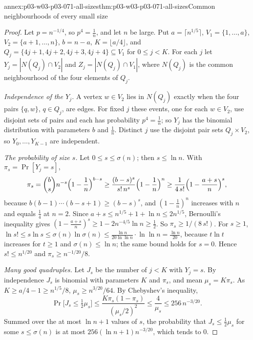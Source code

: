 \begin{annexitem}{annex:p03-w03-p03-071-all-sizes}{thm:p03-w03-p03-071-all-sizes}{Common neighbourhoods of every small size}
\begin{proof}
Let \(p=n^{-1/4}\), so \(p^4=\frac1n\), and let \(n\) be large.  Put
\(a=\lceil n^{1/5}\rceil\), \(V_1=\{1,\ldots,a\}\),
\(V_2=\{a+1,\ldots,n\}\), \(b=n-a\), \(K=\lfloor a/4\rfloor\), and
\(Q_j=\{4j+1,4j+2,4j+3,4j+4\}\subseteq V_1\) for \(0\leq j<K\).
For each \(j\) let \(Y_j=|N(Q_j)\cap V_2|\) and
\(Z_j=|N(Q_j)\cap V_1|\), where \(N(Q_j)\) is the common neighbourhood
of the four elements of \(Q_j\).

\emph{Independence of the \(Y_j\).}  A vertex \(w\in V_2\) lies in
\(N(Q_j)\) exactly when the four pairs \(\{q,w\}\), \(q\in Q_j\), are edges.
For fixed \(j\) these events, one for each \(w\in V_2\), use disjoint
sets of pairs and each has probability \(p^4=\frac1n\); so \(Y_j\) has the
binomial distribution with parameters \(b\) and \(\frac1n\).  Distinct
\(j\) use the disjoint pair sets \(Q_j\times V_2\), so
\(Y_0,\ldots,Y_{K-1}\) are independent.

\emph{The probability of size \(s\).}  Let \(0\leq s\leq\sigma(n)\); then
\(s\leq\ln n\).  With \(\pi_s=\Pr[Y_j=s]\),
\[
  \pi_s=\binom bs n^{-s}\Bigl(1-\frac1n\Bigr)^{b-s}
  \geq\frac{(b-s)^s}{s!\,n^s}\Bigl(1-\frac1n\Bigr)^{n}
  \geq\frac1{4\,s!}\Bigl(1-\frac{a+s}n\Bigr)^s ,
\]
because \(b(b-1)\cdots(b-s+1)\geq(b-s)^s\), and \((1-\frac1n)^n\) increases
with \(n\) and equals \(\frac14\) at \(n=2\).  Since \(a+s\leq n^{1/5}+1+\ln
n\leq2n^{1/5}\), Bernoulli's inequality gives
\((1-\frac{a+s}n)^s\geq1-2n^{-4/5}\ln n\geq\frac12\).  So
\(\pi_s\geq1/(8\,s!)\).  For \(s\geq1\), \(\ln s!\leq s\ln s\leq
\sigma(n)\ln\sigma(n)\leq\frac{\ln n}{20\ln\ln n}\cdot\ln\ln n=\frac{\ln
n}{20}\), because \(t\ln t\) increases for \(t\geq1\) and \(\sigma(n)\leq\ln
n\); the same bound holds for \(s=0\).  Hence \(s!\leq n^{1/20}\) and
\(\pi_s\geq n^{-1/20}/8\).

\emph{Many good quadruples.}  Let \(J_s\) be the number of \(j<K\) with
\(Y_j=s\).  By independence \(J_s\) is binomial with parameters \(K\) and
\(\pi_s\), and mean \(\mu_s=K\pi_s\).  As \(K\geq a/4-1\geq n^{1/5}/8\),
\(\mu_s\geq n^{3/20}/64\).  By Chebyshev's inequality,
\[
  \Pr\bigl[J_s\leq\tfrac12\mu_s\bigr]\leq
  \frac{K\pi_s(1-\pi_s)}{(\mu_s/2)^2}\leq\frac4{\mu_s}\leq256\,n^{-3/20}.
\]
Summed over the at most \(\ln n+1\) values of \(s\), the probability that
\(J_s\leq\frac12\mu_s\) for some \(s\leq\sigma(n)\) is at most
\(256(\ln n+1)n^{-3/20}\), which tends to \(0\).


\end{proof}
\end{annexitem}
